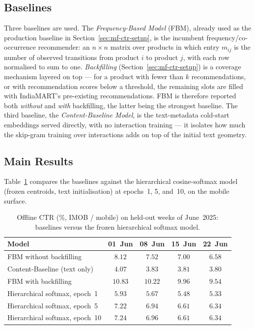 \subsection{Baselines}
\label{sec:emb-baselines}
Three baselines are used. The \emph{Frequency-Based Model} (FBM), already used as
the production baseline in Section~\ref{sec:mf-ctr-setup}, is the incumbent
frequency/co-occurrence recommender: an $n\times n$ matrix over products in which
entry $m_{ij}$ is the number of observed transitions from product $i$ to product
$j$, with each row normalised to sum to one. \emph{Backfilling}
(Section~\ref{sec:mf-ctr-setup}) is a coverage mechanism layered on top --- for a product with
fewer than $k$ recommendations, or with recommendation scores below a
threshold, the remaining slots are filled with IndiaMART's pre-existing
recommendations. FBM is therefore reported both \emph{without} and \emph{with}
backfilling, the latter being the strongest baseline. The third baseline, the
\emph{Content-Baseline Model}, is the text-metadata cold-start embeddings served
directly, with no interaction training --- it isolates how much the skip-gram
training over interactions adds on top of the initial text geometry.

\subsection{Main Results}
\label{sec:emb-main-ctr}
Table~\ref{tab:emb-ctr-main} compares the baselines against the hierarchical
cosine-softmax model (frozen centroids, text initialisation) at epochs~1, 5,
and~10, on the mobile surface.

\begin{table}[ht]
  \centering
  \caption{Offline CTR (\%, IMOB / mobile) on held-out weeks of June~2025:
           baselines versus the frozen hierarchical softmax model.}
  \label{tab:emb-ctr-main}
  \small
  \begin{tabular}{lcccc}
    \toprule
    Model & 01~Jun & 08~Jun & 15~Jun & 22~Jun \\
    \midrule
    FBM without backfilling      & $8.12$ & $7.52$ & $7.00$ & $6.58$ \\
    Content-Baseline (text only) & $4.07$ & $3.83$ & $3.81$ & $3.80$ \\
    FBM with backfilling         & $\mathbf{10.83}$ & $\mathbf{10.22}$ & $\mathbf{9.96}$ & $\mathbf{9.54}$ \\
    \midrule
    Hierarchical softmax, epoch~1  & $5.93$ & $5.67$ & $5.48$ & $5.33$ \\
    Hierarchical softmax, epoch~5  & $7.22$ & $6.94$ & $6.61$ & $6.34$ \\
    Hierarchical softmax, epoch~10 & $7.24$ & $6.96$ & $6.61$ & $6.34$ \\
    \bottomrule
  \end{tabular}
\end{table}

